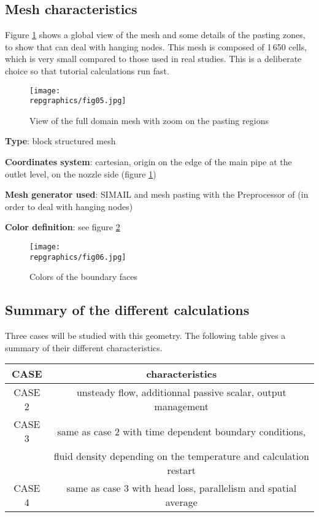         \subsection{Mesh characteristics}

Figure \ref{figante22} shows a global view of the mesh and some details of
the pasting zones, to show that \CS can deal with hanging nodes.
This mesh is composed of 1\,650 cells, which is very small compared to those used in real
studies. This is a deliberate choice so that tutorial calculations run fast.

\begin{figure}[h!]
\begin{center}
\texttt{[image: \\repgraphics/fig05.jpg]}
\caption{View of the full domain mesh with zoom on the pasting regions}
\label{figante22}
\end{center}
\end{figure}

{\bfseries Type}: block structured mesh

{\bfseries Coordinates system}: cartesian, origin on the edge of the main
pipe at the outlet level, on the nozzle side (figure \ref{figante22})

{\bfseries Mesh generator used}: SIMAIL and mesh pasting with the Preprocessor
of \CS (in order to deal with hanging nodes)

{\bfseries Color definition}: see figure \ref{figante23}

\begin{figure}[h!]
\begin{center}
\texttt{[image: \\repgraphics/fig06.jpg]}
\caption{Colors of the boundary faces}
\label{figante23}
\end{center}
\end{figure}


        \subsection{Summary of the different calculations}

Three cases will be studied with this geometry. The following table gives a
summary of their different characteristics.
\begin{center}
\begin{tabular}{|c|c|}
\hline
CASE & characteristics \\
\hline
CASE 2 & unsteady flow, additionnal passive scalar, output management \\
\hline
CASE 3 & same as case 2 with time dependent boundary conditions, \\
 &       fluid density depending on the temperature and calculation restart\\
\hline
CASE 4 & same as case 3 with head loss, parallelism and spatial average \\
\hline
\end{tabular}
\end{center}


